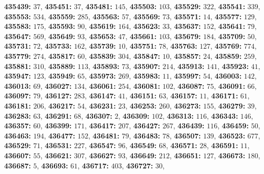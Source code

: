 \textsf{\bfseries 435439:} $37$, \textsf{\bfseries 435451:} $37$, \textsf{\bfseries 435481:} $145$, \textsf{\bfseries 435503:} $103$, \textsf{\bfseries 435529:} $322$, \textsf{\bfseries 435541:} $339$, \textsf{\bfseries 435553:} $534$, \textsf{\bfseries 435559:} $285$, \textsf{\bfseries 435563:} $57$, \textsf{\bfseries 435569:} $73$, \textsf{\bfseries 435571:} $14$, \textsf{\bfseries 435577:} $129$, \textsf{\bfseries 435583:} $175$, \textsf{\bfseries 435593:} $90$, \textsf{\bfseries 435619:} $164$, \textsf{\bfseries 435623:} $33$, \textsf{\bfseries 435637:} $152$, \textsf{\bfseries 435641:} $79$, \textsf{\bfseries 435647:} $569$, \textsf{\bfseries 435649:} $93$, \textsf{\bfseries 435653:} $47$, \textsf{\bfseries 435661:} $103$, \textsf{\bfseries 435679:} $184$, \textsf{\bfseries 435709:} $50$, \textsf{\bfseries 435731:} $72$, \textsf{\bfseries 435733:} $162$, \textsf{\bfseries 435739:} $10$, \textsf{\bfseries 435751:} $78$, \textsf{\bfseries 435763:} $127$, \textsf{\bfseries 435769:} $774$, \textsf{\bfseries 435779:} $274$, \textsf{\bfseries 435817:} $60$, \textsf{\bfseries 435839:} $304$, \textsf{\bfseries 435847:} $10$, \textsf{\bfseries 435857:} $24$, \textsf{\bfseries 435859:} $259$, \textsf{\bfseries 435881:} $310$, \textsf{\bfseries 435889:} $113$, \textsf{\bfseries 435893:} $73$, \textsf{\bfseries 435907:} $214$, \textsf{\bfseries 435913:} $141$, \textsf{\bfseries 435923:} $41$, \textsf{\bfseries 435947:} $123$, \textsf{\bfseries 435949:} $65$, \textsf{\bfseries 435973:} $269$, \textsf{\bfseries 435983:} $11$, \textsf{\bfseries 435997:} $54$, \textsf{\bfseries 436003:} $142$, \textsf{\bfseries 436013:} $69$, \textsf{\bfseries 436027:} $134$, \textsf{\bfseries 436061:} $254$, \textsf{\bfseries 436081:} $102$, \textsf{\bfseries 436087:} $75$, \textsf{\bfseries 436091:} $66$, \textsf{\bfseries 436097:} $79$, \textsf{\bfseries 436127:} $283$, \textsf{\bfseries 436147:} $41$, \textsf{\bfseries 436151:} $63$, \textsf{\bfseries 436157:} $11$, \textsf{\bfseries 436171:} $61$, \textsf{\bfseries 436181:} $206$, \textsf{\bfseries 436217:} $54$, \textsf{\bfseries 436231:} $23$, \textsf{\bfseries 436253:} $260$, \textsf{\bfseries 436273:} $155$, \textsf{\bfseries 436279:} $39$, \textsf{\bfseries 436283:} $63$, \textsf{\bfseries 436291:} $68$, \textsf{\bfseries 436307:} $2$, \textsf{\bfseries 436309:} $102$, \textsf{\bfseries 436313:} $116$, \textsf{\bfseries 436343:} $146$, \textsf{\bfseries 436357:} $60$, \textsf{\bfseries 436399:} $171$, \textsf{\bfseries 436417:} $207$, \textsf{\bfseries 436427:} $267$, \textsf{\bfseries 436439:} $116$, \textsf{\bfseries 436459:} $50$, \textsf{\bfseries 436463:} $194$, \textsf{\bfseries 436477:} $152$, \textsf{\bfseries 436481:} $79$, \textsf{\bfseries 436483:} $78$, \textsf{\bfseries 436507:} $139$, \textsf{\bfseries 436523:} $677$, \textsf{\bfseries 436529:} $71$, \textsf{\bfseries 436531:} $227$, \textsf{\bfseries 436547:} $96$, \textsf{\bfseries 436549:} $68$, \textsf{\bfseries 436571:} $28$, \textsf{\bfseries 436591:} $11$, \textsf{\bfseries 436607:} $55$, \textsf{\bfseries 436621:} $307$, \textsf{\bfseries 436627:} $93$, \textsf{\bfseries 436649:} $212$, \textsf{\bfseries 436651:} $127$, \textsf{\bfseries 436673:} $180$, \textsf{\bfseries 436687:} $5$, \textsf{\bfseries 436693:} $61$, \textsf{\bfseries 436717:} $403$, \textsf{\bfseries 436727:} $30$, 
